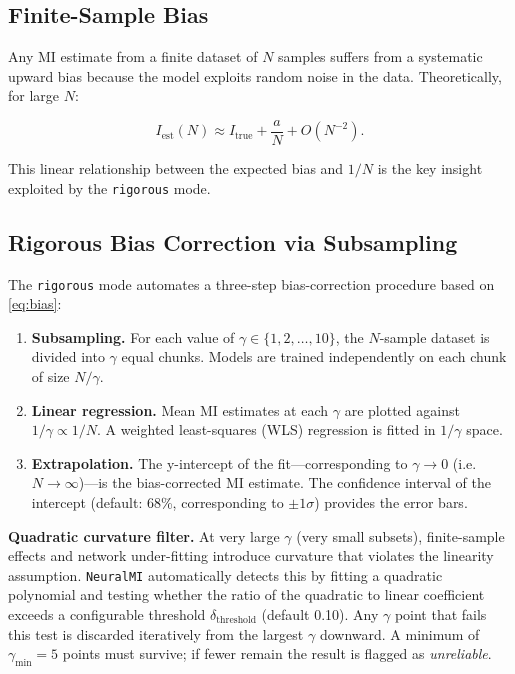 \documentclass[12pt]{article}
\newcommand{\nmi}{\texttt{NeuralMI}}
\newcommand{\api}[1]{\texttt{#1}}
\begin{document}
\subsection{Finite-Sample Bias}
\label{sec:theory:bias}

Any MI estimate from a finite dataset of $N$ samples suffers from a
systematic upward bias because the model exploits random noise in the data.
Theoretically, for large $N$:

\begin{equation}
  I_{\mathrm{est}}(N) \approx I_{\mathrm{true}} + \frac{a}{N} + O(N^{-2}).
  \label{eq:bias}
\end{equation}

This linear relationship between the expected bias and $1/N$ is the key
insight exploited by the \api{rigorous} mode.

\subsection{Rigorous Bias Correction via Subsampling}
\label{sec:theory:rigorous}

The \api{rigorous} mode automates a three-step bias-correction procedure based
on \cref{eq:bias}:

\begin{enumerate}[leftmargin=*]
  \item \textbf{Subsampling.}  For each value of $\gamma \in \{1,2,\ldots,10\}$,
        the $N$-sample dataset is divided into $\gamma$ equal chunks.  Models
        are trained independently on each chunk of size $N/\gamma$.

  \item \textbf{Linear regression.}  Mean MI estimates at each $\gamma$ are
        plotted against $1/\gamma \propto 1/N$.  A weighted least-squares
        (WLS) regression is fitted in $1/\gamma$ space.

  \item \textbf{Extrapolation.}  The y-intercept of the fit—corresponding to
        $\gamma\to 0$ (i.e.\ $N\to\infty$)—is the bias-corrected MI estimate.
        The confidence interval of the intercept (default: 68\%, corresponding
        to $\pm 1\sigma$) provides the error bars.
\end{enumerate}

\textbf{Quadratic curvature filter.}  At very large $\gamma$ (very small
subsets), finite-sample effects and network under-fitting introduce curvature
that violates the linearity assumption.  \nmi{} automatically detects this by
fitting a quadratic polynomial and testing whether the ratio of the quadratic
to linear coefficient exceeds a configurable threshold
$\delta_{\mathrm{threshold}}$ (default 0.10).  Any $\gamma$ point that fails
this test is discarded iteratively from the largest $\gamma$ downward.  A
minimum of $\gamma_{\min}=5$ points must survive; if fewer remain the result
is flagged as \emph{unreliable}.
\end{document}
